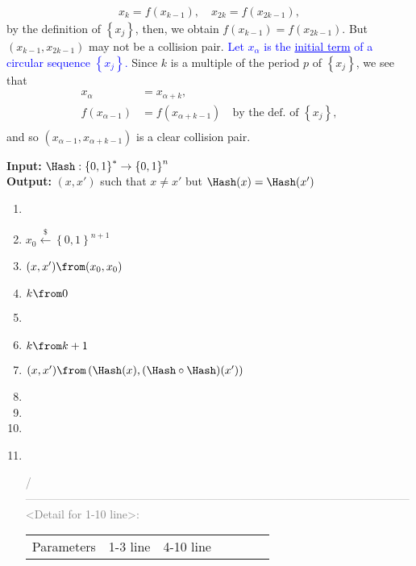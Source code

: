\documentclass[12pt,openany]{book}
\newcommand{\set}[1]{\left\{#1\right\}}
\newcommand{\dollar}{\$}
\newcommand{\uniform}{\xleftarrow{\dollar}}
\begin{document}
\begin{align*}
	x_k=f(x_{k-1}),\quad x_{2k}=f(x_{2k-1}),
	\end{align*} by the definition of $\set{x_j}$, then, we obtain $f(x_{k-1})=f(x_{2k-1})$. But $(x_{k-1},x_{2k-1})$ may not be a collision pair. \textcolor{blue}{Let $x_\alpha$ is the \underline{initial term} of a circular sequence $\set{x_j}$.} Since $k$ is a multiple of the period $p$ of $\set{x_j}$, we see that \begin{align*}
	x_\alpha&=x_{\alpha+k},\\
	f(x_{\alpha-1})&=f(x_{\alpha+k-1})\quad\text{by the def. of $\set{x_j}$},\\
	\end{align*} and so $(x_{\alpha-1},x_{\alpha+k-1})$ is a clear collision pair.
	\iffalse
	\newpage
	\begin{tcolorbox}[title=\textbf{Algorithm.}\ Small-Space Attack, coltitle=black, colback=white,colframe=-red, breakable, enhanced]
		\textbf{Input:} $\Hash:\set{0,1}^*\to\set{0,1}^n$\\
		\textbf{Output:} $(x,x')$ such that $x\neq x'$ but $\Hash(x)=\Hash(x')$ \begin{enumerate}[$1$:]
			\item[] \textcolor{gray}{}
			\item $x_0\uniform\set{0,1}^{n+1}$\quad \textcolor{gray}{}
			\item $(x,x')\from (x_0,x_0)$
			\item $k\from0$
			\item {}
			\item \qquad $k\from k+1$
			\item \qquad $(x,x')\from \left(\Hash(x), (\Hash\circ \Hash)(x')\right)$
			\item \qquad{}
			\item \qquad\qquad{}
			\item \qquad{}
			\item {}\\
			\textcolor{gray}{\slash*------------------------------------------------------------------------------------------------------\\
				<Detail for 1-10 line>: \begin{center}
					\begin{tabular}{c|||c||c||c||c||c||c||c||c||c||c||c||c}
						\toprule[1.5pt]
						Parameters & 1-3 line & \multicolumn{7}{c}{4-10 line} \\

\end{tabular}
\end{center}}
\end{enumerate}
\end{tcolorbox}
\end{document}
